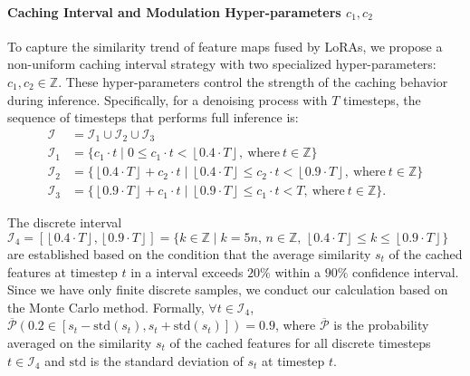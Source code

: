 \paragraph{Caching Interval and Modulation Hyper-parameters $c_{1}, c_{2}$}
To capture the similarity trend of feature maps fused by LoRAs, we propose a non-uniform caching interval strategy with two specialized hyper-parameters: $c_{1}, c_{2}\in\mathbb{Z}$. These hyper-parameters control the strength of the caching behavior during inference. Specifically, for a denoising process with $T$ timesteps, the sequence of timesteps that performs full inference is:
\begin{equation}
\begin{aligned}
    \label{app:cache interval2}
    \mathcal{I} &= \mathcal{I}_{1} \cup \mathcal{I}_{2} \cup \mathcal{I}_{3} \\
    \mathcal{I}_{1} &= \{c_{1}\cdot t \mid 0 \leq c_{1}\cdot t < \left\lfloor 0.4 \cdot T \right\rfloor, \ \text{where} \ t \in \mathbb{Z}\} \\
    \mathcal{I}_{2} &= \{\left\lfloor 0.4 \cdot T \right\rfloor + c_{2}\cdot t \mid \left\lfloor 0.4 \cdot T \right\rfloor \leq c_{2}\cdot t < \left\lfloor 0.9 \cdot T \right\rfloor, \ \text{where} \ t \in \mathbb{Z}\} \\
    \mathcal{I}_{3} &= \{\left\lfloor 0.9 \cdot T \right\rfloor + c_{1}\cdot t \mid \left\lfloor 0.9 \cdot T \right\rfloor \leq c_{1}\cdot t < T, \ \text{where} \ t \in \mathbb{Z}\}.
\end{aligned}
\end{equation}

The discrete interval $\mathcal{I}_{4} = [\left\lfloor 0.4 \cdot T \right\rfloor, \left\lfloor 0.9 \cdot T \right\rfloor]=\{ k \in \mathbb{Z} \mid k = 5n, \, n \in \mathbb{Z}, \, \left\lfloor 0.4 \cdot T \right\rfloor \leq k \leq \left\lfloor 0.9 \cdot T \right\rfloor \}$
 are established based on the condition that the average similarity $s_{t}$ of the cached features at timestep $t$ in a interval exceeds $20\%$ within a $90\%$ confidence interval. Since we have only finite discrete samples, we conduct our calculation based on the Monte Carlo method. Formally, $\forall t \in \mathcal{I}_{4}$, $\overline{\mathcal{P}}\left(0.2\in[s_{t}-\text{std}(s_{t}),s_{t}+\text{std}(s_{t})]\right)=0.9$, where $\overline{\mathcal{P}}$ is the probability averaged on the similarity $s_{t}$ of the cached features for all discrete timesteps $t\in \mathcal{I}_{4}$ and $\text{std}$ is the standard deviation of $s_{t}$ at timestep $t$.

